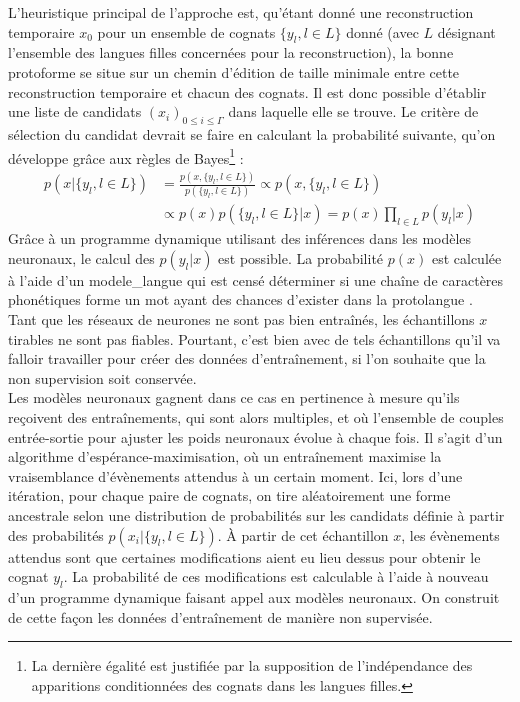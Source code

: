 \documentclass[12pt, twoside]{report}
\begin{document}
L'heuristique principal de l'approche est, qu'étant donné une reconstruction temporaire $x_0$ pour un ensemble de \glspl{cognat} $\{y_l, l\in L \}$ donné (avec $L$ désignant l'ensemble des langues filles concernées pour la reconstruction), la bonne \gls{protoforme} se situe sur un chemin d'édition de taille minimale entre cette reconstruction temporaire et chacun des \glspl{cognat}. Il est donc possible d'établir une liste de candidats $(x_i)_{0\leq{}i\leq{}\Gamma}$ dans laquelle elle se trouve. Le critère de sélection du candidat devrait se faire en calculant la probabilité suivante, qu'on développe grâce aux règles de Bayes\footnote{La dernière égalité est justifiée par la supposition de l'indépendance des apparitions conditionnées des \glspl{cognat} dans les langues filles.} :
\begin{equation} \label{probaSampling}
    \begin{split}
        p(x|\{y_l, l \in L\}) & = \frac{p(x, \{y_l, l \in L\})}{p(\{y_l, l \in L\})} \propto p(x, \{y_l, l \in L\})\\
        & \propto p(x)p(\{y_l, l \in L\}|x) = p(x)\prod_{l\in L} p(y_l|x)
    \end{split}
\end{equation}
Grâce à un programme dynamique utilisant des inférences dans les modèles neuronaux, le calcul des $p(y_l|x)$ est possible. La probabilité $p(x)$ est calculée à l'aide d'un \gls{modele_langue} qui est censé déterminer si une chaîne de caractères phonétiques forme un mot ayant des chances d'exister dans la protolangue \autocite[section 5]{he2022neural}.\\

Tant que les réseaux de neurones ne sont pas bien entraînés, les échantillons $x$ tirables ne sont pas fiables. Pourtant, c'est bien avec de tels échantillons qu'il va falloir travailler pour créer des données d'entraînement, si l'on souhaite que la non supervision soit conservée.\\
Les modèles neuronaux gagnent dans ce cas en pertinence à mesure qu'ils reçoivent des entraînements, qui sont alors multiples, et où l'ensemble de couples entrée-sortie pour ajuster les poids neuronaux évolue à chaque fois. Il s'agit d'un algorithme d'espérance-maximisation\autocite{EM}, où un entraînement maximise la vraisemblance d'évènements attendus à un certain moment. Ici, lors d'une itération, pour chaque paire de \glspl{cognat}, on tire aléatoirement une forme ancestrale selon une distribution de probabilités sur les candidats définie à partir des probabilités $p(x_i|\{y_l, l \in L\})$. À partir de cet échantillon $x$, les évènements attendus sont que certaines modifications aient eu lieu dessus pour obtenir le \gls{cognat} $y_l$. La probabilité de ces modifications est calculable à l'aide à nouveau d'un programme dynamique faisant appel aux modèles neuronaux. On construit de cette façon les données d'entraînement de manière non supervisée.\autocite[section 6]{he2022neural}
\end{document}
